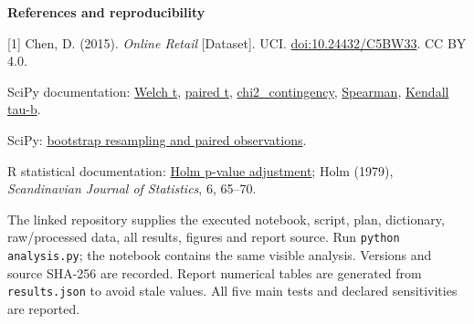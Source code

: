 \documentclass[10pt,a4paper,twocolumn]{article}
\newcommand{\minihead}[1]{\par\needspace{8\baselineskip}\smallskip\textbf{#1}\par}
\newcommand{\code}[1]{\texttt{#1}}
\begin{document}
\minihead{References and reproducibility}
{\footnotesize
[1] Chen, D. (2015). \emph{Online Retail} [Dataset]. UCI. \href{https://doi.org/10.24432/C5BW33}{doi:10.24432/C5BW33}. CC BY 4.0.\par
[2] SciPy documentation: \href{https://docs.scipy.org/doc/scipy/reference/generated/scipy.stats.ttest_ind.html}{Welch t}, \href{https://docs.scipy.org/doc/scipy/reference/generated/scipy.stats.ttest_rel.html}{paired t}, \href{https://docs.scipy.org/doc/scipy/reference/generated/scipy.stats.chi2_contingency.html}{chi2\_contingency}, \href{https://docs.scipy.org/doc/scipy/reference/generated/scipy.stats.spearmanr.html}{Spearman}, \href{https://docs.scipy.org/doc/scipy/reference/generated/scipy.stats.kendalltau.html}{Kendall tau-b}.\par
[3] SciPy: \href{https://docs.scipy.org/doc/scipy/reference/generated/scipy.stats.bootstrap.html}{bootstrap resampling and paired observations}.\par
[4] R statistical documentation: \href{https://stat.ethz.ch/R-manual/R-devel/library/stats/html/p.adjust.html}{Holm p-value adjustment}; Holm (1979), \emph{Scandinavian Journal of Statistics}, 6, 65--70.

The linked repository supplies the executed notebook, script, plan, dictionary, raw/processed data, all results, figures and report source. Run \code{python analysis.py}; the notebook contains the same visible analysis. Versions and source SHA-256 are recorded. Report numerical tables are generated from \code{results.json} to avoid stale values. All five main tests and declared sensitivities are reported.
}
\end{document}
